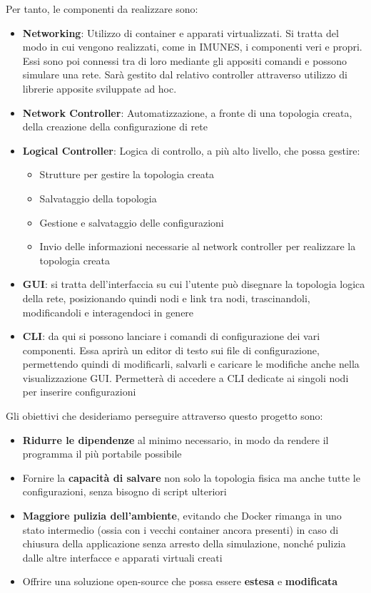 Per tanto, le componenti da realizzare sono:
\begin{itemize}
    \item \textbf{Networking}: Utilizzo di container e apparati virtualizzati. Si tratta del modo in cui vengono realizzati, come in IMUNES, i componenti veri e propri. Essi sono poi connessi tra di loro mediante gli appositi comandi e possono simulare una rete. Sarà gestito dal relativo controller attraverso utilizzo di librerie apposite sviluppate ad hoc.
    \item \textbf{Network Controller}: Automatizzazione, a fronte di una topologia creata, della creazione della configurazione di rete
    \item \textbf{Logical Controller}: Logica di controllo, a più alto livello, che possa gestire:
          \begin{itemize}
              \item Strutture per gestire la topologia creata
              \item Salvataggio della topologia
              \item Gestione e salvataggio delle configurazioni
              \item Invio delle informazioni necessarie al network controller per realizzare la topologia creata
          \end{itemize}
    \item \textbf{GUI}: si tratta dell'interfaccia su cui l'utente può disegnare la topologia logica della rete, posizionando quindi nodi e link tra nodi, trascinandoli, modificandoli e interagendoci in genere
    \item \textbf{CLI}: da qui si possono lanciare i comandi di configurazione dei vari componenti. Essa aprirà un editor di testo sui file di configurazione, permettendo quindi di modificarli, salvarli e caricare le modifiche anche nella visualizzazione GUI. Permetterà di accedere a CLI dedicate ai singoli nodi per inserire configurazioni
\end{itemize}
Gli obiettivi che desideriamo perseguire attraverso questo progetto sono:
\begin{itemize}
    \item \textbf{Ridurre le dipendenze} al minimo necessario, in modo da rendere il programma il più portabile possibile
    \item Fornire la \textbf{capacità di salvare} non solo la topologia fisica ma anche tutte le configurazioni, senza bisogno di script ulteriori
    \item \textbf{Maggiore pulizia dell'ambiente}, evitando che Docker rimanga in uno stato intermedio (ossia con i vecchi container ancora presenti) in caso di chiusura della applicazione senza arresto della simulazione, nonché pulizia dalle altre interfacce e apparati virtuali creati
    \item Offrire una soluzione open-source che possa essere \textbf{estesa} e \textbf{modificata}
\end{itemize}


\newpage
